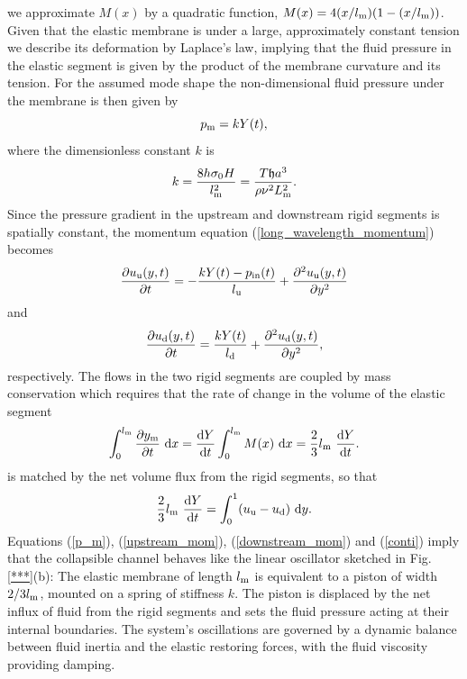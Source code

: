 \documentclass[aps,prl,reprint,superscriptaddress,floatfix]{revtex4-1}
\newcommand{\be}{\begin{equation}}
\newcommand{\ee}{\end{equation}}
\begin{document}
we approximate $M(x)$ by a quadratic function,
$M(x) = 4 (x/l_{\rm  m})(1-(x/l_{\rm m}))$. Given that the 
elastic membrane is under a large, approximately constant tension we describe
its deformation by Laplace's law, implying that the fluid pressure
in the elastic segment is given by the product
of the membrane curvature and its tension. For the assumed mode shape
the non-dimensional fluid pressure under the membrane is then given by
\be
\label{p_m}
p_{\rm m} = k Y(t),
\ee
where the dimensionless constant $k$ is
\be
k = \frac{8 h \sigma_0 H}{l_{\rm m}^2}
= \frac{T\mathfrak{h}a^3}{\rho \nu^2 L_{\rm m}^2}.
\ee
Since the pressure gradient in the upstream and downstream rigid
segments is spatially constant, the momentum equation
(\ref{long_wavelength_momentum}) becomes
\be
\label{upstream_mom}
\frac{\partial u_{\rm u}(y,t)}{\partial t} =
-\frac{k Y(t) - p_{\rm in}(t)}{l_{\rm u}} +
\frac{\partial^2 u_{\rm u}(y,t)}{\partial y^2}
\ee
and
\be
\label{downstream_mom}
\frac{\partial u_{\rm d}(y,t)}{\partial t} =
\frac{k Y(t)}{l_{\rm d}} +
\frac{\partial^2 u_{\rm d}(y,t)}{\partial y^2},
\ee
respectively.
The flows in the two rigid segments are coupled by
mass conservation which requires that the
rate of change in the volume of the elastic segment
\be
\int_0^{l_{\rm m}} \frac{\partial y_{\rm m}}{\partial t} \ {\rm d}x =
\frac{{\rm d}Y}{{\rm d}t} \int_0^{l_{\rm m}} M(x) \ {\rm d}x  = 
\frac{2}{3} l_{\rm m} \ \frac{{\rm d}Y}{{\rm d}t}.
\ee
is matched by the net volume flux from the rigid segments, so that
\be
\label{conti}
\frac{2}{3} l_{\rm m}  \ \frac{{\rm d}Y}{{\rm d}t}
= \int_0^1  (u_{\rm u} - u_{\rm d} ) \ {\rm d}y.
\ee
Equations (\ref{p_m}), (\ref{upstream_mom}), (\ref{downstream_mom})
and (\ref{conti}) imply that the collapsible
channel behaves like the linear oscillator sketched in 
Fig. \ref{***}(b): The elastic membrane of length $l_{\rm m}$
is equivalent to a piston of width $2/3l_{\rm m}$, mounted on a spring
of stiffness $k$. The piston is displaced by the net influx of
fluid from the rigid segments and sets the fluid pressure acting at
their internal boundaries. The system's oscillations are
governed by a dynamic balance between fluid inertia and the
elastic restoring forces, with the fluid viscosity providing
damping.
\end{document}
